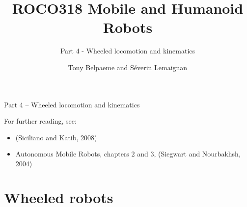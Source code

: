 \documentclass[compress]{beamer}
\title{ROCO318 \newline Mobile and Humanoid Robots}
\subtitle{Part 4 - Wheeled locomotion and kinematics}
\date{}
\author{Tony Belpaeme and Séverin Lemaignan}
\institute{Centre for Neural Systems and Robotics\\{\bf Plymouth University}}
\begin{document}

\maketitle

\begin{frame}{Part 4 -- Wheeled locomotion and kinematics}

For further reading, see:
    
    \begin{itemize}
        \item (Siciliano and Katib, 2008)
        \item Autonomous Mobile Robots, chapters 2 and 3, (Siegwart and Nourbakhsh, 2004)
    \end{itemize}
\end{frame}

\section{Wheeled robots}
\end{document}
